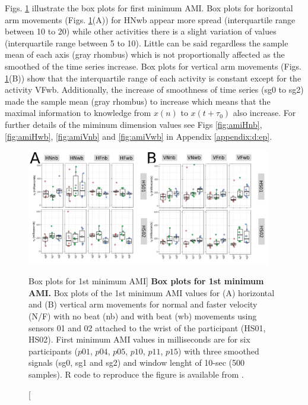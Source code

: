 Figs. \ref{fig:AMI-hii} illustrate the box plots for first minimum AMI.
Box plots for horizontal arm movements (Figs. \ref{fig:AMI-hii}(A)) for 
HNwb appear more spread (interquartile range between 10 to 20) while 
other activities there is a slight variation of values 
(interquartile range between 5 to 10).
Little can be said regardless the sample mean of each axis (gray rhombus) 
which is not proportionally affected as the smoothed of the time series 
increase.
Box plots for vertical arm movements (Figs. \ref{fig:AMI-hii}(B)) 
show that the interquartile range of each activity is constant
except for the activity VFwb.
Additionally, the increase of smoothness of time series (sg0 to sg2) made 
the sample mean (gray rhombus) to increase which means that 
the maximal information to knowledge from $x(n)$ to $x(t+\tau_0)$ also 
increase.
For further details of the miminum dimension values see 
Figs \ref{fig:amiHnb}, \ref{fig:amiHwb}, \ref{fig:amiVnb} and \ref{fig:amiVwb}
in Appendix \ref{appendix:d:ep}.
\begin{figure}
\centering
\includegraphics[width=0.95\textwidth]{fig_5_04}
	\caption
	[Box plots for 1st minimum AMI]{
	{\bf Box plots for 1st minimum AMI.} 
		Box plots of the 1st minimum AMI values for 
		(A) horizontal and (B) vertical arm movements for
		normal and faster velocity (N/F) with no beat (nb) 
		and with beat (wb) movements
		using sensors 01 and 02 attached to the wrist of the 
		participant (HS01, HS02).
		First minimum AMI values in milliseconds are 
		for six participants 
		($p01$, $p04$, $p05$, $p10$, $p11$, $p15$) with three 
		smoothed signals (sg0, sg1 and sg2)
		and window lenght of 10-sec (500 samples).
		R code to reproduce the figure is available 
		from \cite{xochicale2018}.
        }
    \label{fig:AMI-hii}
\end{figure}

